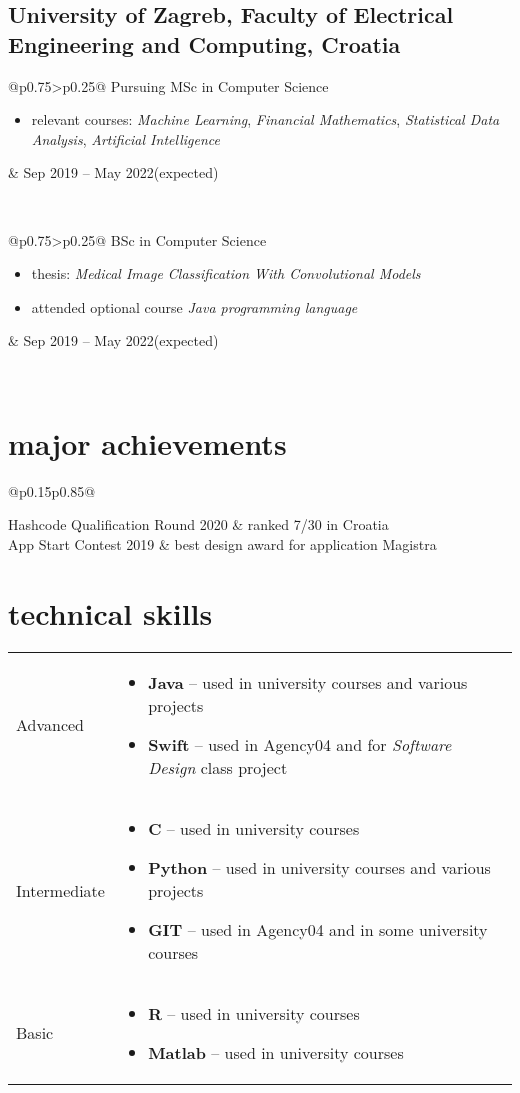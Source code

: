 \documentclass[a4paper]{article}
\makeatletter
\newlength{\tablewidth}
\newenvironment{period}[2]{%
\newcommand{\sarma}{#2}%
\setlength{\tablewidth}{\linewidth}
\addtolength{\tablewidth}{-2\tabcolsep}
\begin{tabular}{@{}p{0.75\tablewidth}>{\raggedleft\arraybackslash}p{0.25\tablewidth}@{}}%
#1 \newline
\begin{itemize}
}{%
\end{itemize} & \sarma \\%
\end{tabular}\\
}
\newenvironment{skills}{%
\setlength{\tablewidth}{\linewidth}
\addtolength{\tablewidth}{-2\tabcolsep}
\begin{tabular}{@{}p{0.15\tablewidth}p{0.85\tablewidth}@{}}
}{%
\end{tabular}
}
\makeatother
\begin{document}
\subsection{University of Zagreb, Faculty of Electrical Engineering and Computing, Croatia}
\begin{period}{Pursuing MSc in Computer Science}{Sep 2019 -- May 2022\linebreak(expected)}
    \item relevant courses:
        \textit{Machine Learning},
        \textit{Financial Mathematics},
        \textit{Statistical Data Analysis},
        \textit{Artificial Intelligence}
\end{period}
\begin{period}{BSc in Computer Science}{Sep 2016 -- Jul 2019}
    \item thesis:
        \textit{Medical Image Classification With Convolutional Models}
    \item attended optional course \textit{Java programming language}
\end{period}

\section{major achievements}
\begin{skills}
    Hashcode Qualification Round 2020   &   ranked 7/30 in Croatia\\
    App Start Contest 2019  &   best design award for application Magistra
\end{skills}

\section{technical skills}
\begin{skills}
    Advanced &
    \begin{itemize}
        \item \textbf{Java} -- used in university courses and various projects
        \item \textbf{Swift} -- used in Agency04 and for \textit{Software Design} class project
    \end{itemize} \\
    Intermediate &
    \begin{itemize}
        \item \textbf{C} -- used in university courses
        \item \textbf{Python} -- used in university courses and various projects
        \item \textbf{GIT} -- used in Agency04 and in some university courses
    \end{itemize} \\
    Basic &
    \begin{itemize}
        \item \textbf{R} -- used in university courses
        \item \textbf{Matlab} -- used in university courses
    \end{itemize} \\
\end{skills}
\end{document}
